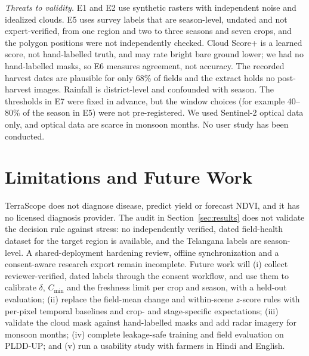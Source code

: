 \documentclass[conference]{IEEEtran}
\begin{document}
\textit{Threats to validity.} E1 and E2 use synthetic rasters with independent noise and idealized clouds. E5 uses survey labels that are season-level, undated and not expert-verified, from one region and two to three seasons and seven crops, and the polygon positions were not independently checked. Cloud Score+ is a learned score, not hand-labelled truth, and may rate bright bare ground lower; we had no hand-labelled masks, so E6 measures agreement, not accuracy. The recorded harvest dates are plausible for only 68\% of fields and the extract holds no post-harvest images. Rainfall is district-level and confounded with season. The thresholds in E7 were fixed in advance, but the window choices (for example 40--80\% of the season in E5) were not pre-registered. We used Sentinel-2 optical data only, and optical data are scarce in monsoon months. No user study has been conducted.

\section{Limitations and Future Work}
TerraScope does not diagnose disease, predict yield or forecast NDVI, and it has no licensed diagnosis provider. The audit in Section~\ref{sec:results} does not validate the decision rule against stress: no independently verified, dated field-health dataset for the target region is available, and the Telangana labels are season-level. A shared-deployment hardening review, offline synchronization and a consent-aware research export remain incomplete. Future work will (i) collect reviewer-verified, dated labels through the consent workflow, and use them to calibrate $\delta$, $C_{\min}$ and the freshness limit per crop and season, with a held-out evaluation; (ii) replace the field-mean change and within-scene $z$-score rules with per-pixel temporal baselines and crop- and stage-specific expectations; (iii) validate the cloud mask against hand-labelled masks and add radar imagery for monsoon months; (iv) complete leakage-safe training and field evaluation on PLDD-UP; and (v) run a usability study with farmers in Hindi and English.

\end{document}
